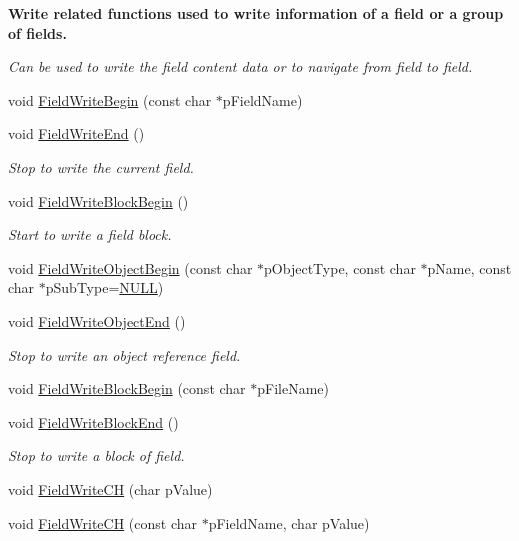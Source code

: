 \begin{Indent}\textbf{ Write related functions used to write information of a field or a group of fields.}\par
{\em Can be used to write the field content data or to navigate from field to field. }\begin{DoxyCompactItemize}
\item 
void \hyperlink{class_fbx_i_o_a90021ceea4f62a09dbe0dc3f6e377cfd}{Field\+Write\+Begin} (const char $\ast$p\+Field\+Name)
\item 
void \hyperlink{class_fbx_i_o_ad74f941d4833b9f646db76e9f0f15f78}{Field\+Write\+End} ()
\begin{DoxyCompactList}\small\item\em Stop to write the current field. \end{DoxyCompactList}\item 
void \hyperlink{class_fbx_i_o_a2e07ae609e53d26a88f13b4b04c1858c}{Field\+Write\+Block\+Begin} ()
\begin{DoxyCompactList}\small\item\em Start to write a field block. \end{DoxyCompactList}\item 
void \hyperlink{class_fbx_i_o_a15640a11da1da9a9b75f1ed62ac1744b}{Field\+Write\+Object\+Begin} (const char $\ast$p\+Object\+Type, const char $\ast$p\+Name, const char $\ast$p\+Sub\+Type=\hyperlink{fbxarch_8h_a070d2ce7b6bb7e5c05602aa8c308d0c4}{N\+U\+LL})
\item 
void \hyperlink{class_fbx_i_o_aa00ff76ada8b014c7287947887e16d93}{Field\+Write\+Object\+End} ()
\begin{DoxyCompactList}\small\item\em Stop to write an object reference field. \end{DoxyCompactList}\item 
void \hyperlink{class_fbx_i_o_a37c1bbfe8ebf2bffb7f35fd01b7595af}{Field\+Write\+Block\+Begin} (const char $\ast$p\+File\+Name)
\item 
void \hyperlink{class_fbx_i_o_a67d6d04f003fc5ebb970f5ef74fe91eb}{Field\+Write\+Block\+End} ()
\begin{DoxyCompactList}\small\item\em Stop to write a block of field. \end{DoxyCompactList}\item 
void \hyperlink{class_fbx_i_o_afdbe7055dbadc85cebbdfa35138a193b}{Field\+Write\+CH} (char p\+Value)
\item 
void \hyperlink{class_fbx_i_o_a58d0b097238940fa99ef5eaa81c7df50}{Field\+Write\+CH} (const char $\ast$p\+Field\+Name, char p\+Value)

\end{DoxyCompactItemize}
\end{Indent}
